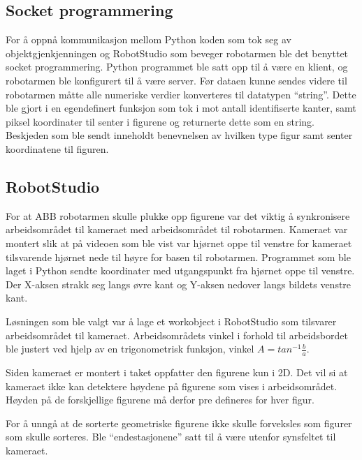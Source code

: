 \documentclass[conference]{IEEEtran}
\begin{document}
    \subsection{Socket programmering}
        For å oppnå kommunikasjon mellom Python koden som tok seg av objektgjenkjenningen og RobotStudio som beveger robotarmen ble det benyttet socket 
        programmering. Python programmet ble satt opp til å være en klient, og robotarmen ble konfigurert til å være server. Før dataen kunne sendes videre 
        til robotarmen måtte alle numeriske verdier konverteres til datatypen “string”.  Dette ble gjort i en egendefinert funksjon som tok i mot antall 
        identifiserte kanter, samt piksel koordinater til senter i figurene og returnerte dette som en string. Beskjeden som ble sendt inneholdt benevnelsen 
        av hvilken type figur samt senter koordinatene til figuren.

    \subsection{RobotStudio}
        For at ABB robotarmen skulle plukke opp figurene var det viktig å synkronisere arbeidsområdet til kameraet med arbeidsområdet til robotarmen. 
        Kameraet var montert slik at på videoen som ble vist var hjørnet oppe til venstre for kameraet tilsvarende hjørnet nede til høyre for basen 
        til robotarmen. Programmet som ble laget i Python sendte koordinater med utgangspunkt fra hjørnet oppe til venstre. Der X-aksen strakk seg 
        langs øvre kant og Y-aksen nedover langs bildets venstre kant.

        Løsningen som ble valgt var å lage et workobject i RobotStudio som tilsvarer arbeidsområdet til kameraet. Arbeidsområdets vinkel i forhold til 
        arbeidsbordet ble justert ved hjelp av en trigonometrisk funksjon, vinkel $A = tan^{-1}\frac{b}{a}$.


        Siden kameraet er montert i taket oppfatter den figurene kun i 2D. Det vil si at kameraet ikke kan detektere høydene på figurene som vises i 
        arbeidsområdet. Høyden på de forskjellige figurene må derfor pre defineres for hver figur. 

        For å unngå at de sorterte geometriske figurene ikke skulle forveksles som figurer som skulle sorteres. Ble “endestasjonene” satt til å være 
        utenfor synsfeltet til kameraet.
\end{document}
